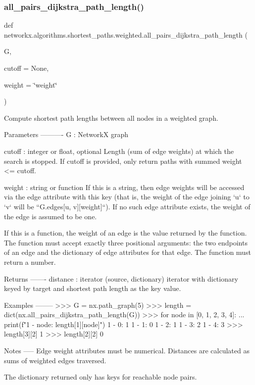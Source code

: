 \subsubsection{\texorpdfstring{all\+\_\+pairs\+\_\+dijkstra\+\_\+path\+\_\+length()}{all\_pairs\_dijkstra\_path\_length()}}
{\footnotesize\ttfamily def networkx.\+algorithms.\+shortest\+\_\+paths.\+weighted.\+all\+\_\+pairs\+\_\+dijkstra\+\_\+path\+\_\+length (\begin{DoxyParamCaption}\item[{}]{G,  }\item[{}]{cutoff = {\ttfamily None},  }\item[{}]{weight = {\ttfamily \char`\"{}weight\char`\"{}} }\end{DoxyParamCaption})}

\begin{DoxyVerb}Compute shortest path lengths between all nodes in a weighted graph.

Parameters
----------
G : NetworkX graph

cutoff : integer or float, optional
    Length (sum of edge weights) at which the search is stopped.
    If cutoff is provided, only return paths with summed weight <= cutoff.

weight : string or function
    If this is a string, then edge weights will be accessed via the
    edge attribute with this key (that is, the weight of the edge
    joining `u` to `v` will be ``G.edges[u, v][weight]``). If no
    such edge attribute exists, the weight of the edge is assumed to
    be one.

    If this is a function, the weight of an edge is the value
    returned by the function. The function must accept exactly three
    positional arguments: the two endpoints of an edge and the
    dictionary of edge attributes for that edge. The function must
    return a number.

Returns
-------
distance : iterator
    (source, dictionary) iterator with dictionary keyed by target and
    shortest path length as the key value.

Examples
--------
>>> G = nx.path_graph(5)
>>> length = dict(nx.all_pairs_dijkstra_path_length(G))
>>> for node in [0, 1, 2, 3, 4]:
...     print(f"1 - {node}: {length[1][node]}")
1 - 0: 1
1 - 1: 0
1 - 2: 1
1 - 3: 2
1 - 4: 3
>>> length[3][2]
1
>>> length[2][2]
0

Notes
-----
Edge weight attributes must be numerical.
Distances are calculated as sums of weighted edges traversed.

The dictionary returned only has keys for reachable node pairs.
\end{DoxyVerb}
 \mbox{\label{namespacenetworkx_1_1algorithms_1_1shortest__paths_1_1weighted_a9e342fe36f78d22f22315472f5e4845a}} 
